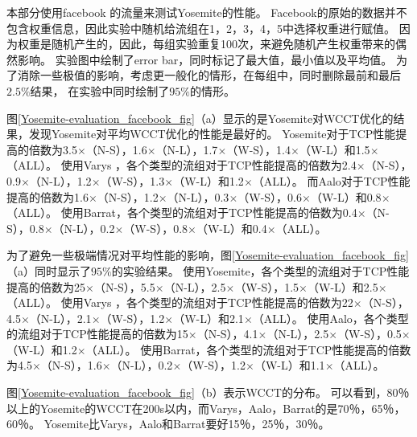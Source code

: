本部分使用facebook \cite{chowdhury2014efficient}的流量来测试Yosemite的性能。
Facebook的原始的数据并不包含权重信息，因此实验中随机给流组在1，2，3，4，5中选择权重进行赋值。
因为权重是随机产生的，因此，每组实验重复100次，来避免随机产生权重带来的偶然影响。
实验图中绘制了error bar，同时标记了最大值，最小值以及平均值。
为了消除一些极值的影响，考虑更一般化的情形，在每组中，同时删除最前和最后$2.5\%$结果，
在实验中同时绘制了$95\%$的情形。

图\ref{Yosemite-evaluation_facebook_fig}（a）显示的是Yosemite对WCCT优化的结果，发现Yosemite对平均WCCT优化的性能是最好的。
Yosemite对于TCP性能提高的倍数为3.5$\times$（N-S），1.6$\times$（N-L），1.7$\times$（W-S），1.4$\times$（W-L）和1.5$\times$（ALL）。
使用Varys ，各个类型的流组对于TCP性能提高的倍数为2.4$\times$（N-S），0.9$\times$（N-L），1.2$\times$（W-S），1.3$\times$（W-L）和1.2$\times$（ALL）。
而Aalo对于TCP性能提高的倍数为1.6$\times$（N-S），1.2$\times$（N-L），0.3$\times$（W-S），0.6$\times$（W-L）和0.8$\times$（ALL）。
使用Barrat，各个类型的流组对于TCP性能提高的倍数为0.4$\times$（N-S），0.8$\times$（N-L），0.2$\times$（W-S），0.8$\times$（W-L）和0.4$\times$（ALL）。

为了避免一些极端情况对平均性能的影响，图\ref{Yosemite-evaluation_facebook_fig}（a）同时显示了$95\%$的实验结果。
使用Yosemite，各个类型的流组对于TCP性能提高的倍数为25$\times$（N-S），5.5$\times$（N-L），2.5$\times$（W-S），1.5$\times$（W-L）和2.5$\times$（ALL）。
使用Varys ，各个类型的流组对于TCP性能提高的倍数为22$\times$（N-S），4.5$\times$（N-L），2.1$\times$（W-S），1.2$\times$（W-L）和2.1$\times$（ALL）。
使用Aalo，各个类型的流组对于TCP性能提高的倍数为15$\times$（N-S），4.1$\times$（N-L），2.5$\times$（W-S），0.5$\times$（W-L）和1.2$\times$（ALL）。
使用Barrat，各个类型的流组对于TCP性能提高的倍数为4.5$\times$（N-S），1.6$\times$（N-L），0.2$\times$（W-S），1.2$\times$（W-L）和1.1$\times$（ALL）。


图\ref{Yosemite-evaluation_facebook_fig}（b）表示WCCT的分布。
可以看到，80％以上的Yosemite的WCCT在200s以内，而Varys，Aalo，Barrat的是70％，65％，60％。
Yosemite比Varys，Aalo和Barrat要好15％，25％，30％。


